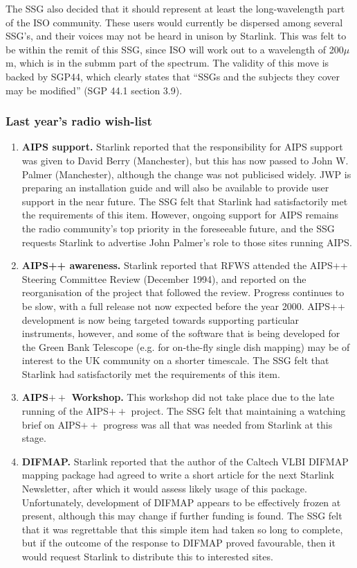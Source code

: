 The SSG also decided that it should represent at least the
long-wavelength part of the ISO community. These users would currently
be dispersed among several SSG's, and their voices may not be heard in
unison by Starlink. This was felt to be within the remit of this SSG,
since ISO will work out to a wavelength of 200$\mu$m, which is in the
submm part of the spectrum. The validity of this move is backed by
SGP44, which clearly states that ``SSGs and the subjects they cover
may be modified'' (SGP 44.1 section 3.9).

\subsubsection{Last year's radio wish-list}

\begin{enumerate}
\item {\bf AIPS support.} Starlink reported that the responsibility for AIPS
support was given to David Berry (Manchester), but this has now passed
to John W. Palmer (Manchester), although the change was not publicised
widely. JWP is preparing an installation guide and will also be
available to provide user support in the near future. The SSG felt
that Starlink had satisfactorily met the requirements of this
item. However, ongoing support for AIPS remains the radio community's
top priority in the foreseeable future, and the SSG requests Starlink
to advertise John Palmer's role to those sites running AIPS.

\item {\bf AIPS++ awareness.} Starlink reported that RFWS attended the AIPS++
Steering Committee Review (December 1994), and reported on the
reorganisation of the project that followed the review. Progress
continues to be slow, with a full release not now expected before the
year 2000. AIPS++ development is now being targeted towards supporting
particular instruments, however, and some of the software that is
being developed for the Green Bank Telescope (e.g. for on-the-fly
single dish mapping) may be of interest to the UK community on a
shorter timescale. The SSG felt that Starlink had satisfactorily met
the requirements of this item.

\item {\bf AIPS$++$ Workshop.} This workshop did not take place due to the late
running of the AIPS$++$ project. The SSG felt that maintaining a
watching brief on AIPS$++$ progress was all that was needed from
Starlink at this stage.

\item {\bf DIFMAP.} Starlink reported that the author of the Caltech
VLBI DIFMAP mapping package had agreed to write a short article for
the next Starlink Newsletter, after which it would assess likely usage
of this package.  Unfortunately, development of DIFMAP appears to be
effectively frozen at present, although this may change if further
funding is found. The SSG felt that it was regrettable that this
simple item had taken so long to complete, but if the outcome of the
response to DIFMAP proved favourable, then it would request Starlink
to distribute this to interested sites.


\end{enumerate}
